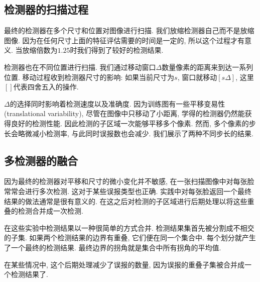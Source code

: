 \documentclass[a4paper,utf8,11pt, onecolumn]{ctexart}
\begin{document}
\subsection{检测器的扫描过程}
最终的检测器在多个尺寸和位置对图像进行扫描. 我们放缩检测器自己而不是放缩图像. 因为在任何尺寸上面的特征评估需要的时间是一定的, 所以这个过程才有意义. 当放缩倍数为$1.25$时我们得到了较好的检测结果.

检测器也在不同位置进行扫描. 我们通过移动窗口$\Delta$数量像素的距离来到达一系列位置. 移动过程收到检测器尺寸的影响: 如果当前尺寸为$s$, 窗口就移动$[s\Delta]$, 这里$[]$代表四舍五入的操作.

$\Delta$的选择同时影响着检测速度以及准确度. 因为训练图有一些平移变易性 (translational variability), 尽管在图像中只移动了小距离, 学得的检测器仍然能获得良好的检测性能. 因此检测的子区域一次能够平移多个像素.
然而, 多个像素的步长会略微减小检测率, 与此同时误报数也会减少. 我们展示了两种不同步长的结果.

\subsection{多检测器的融合}
因为最终的检测器对平移和尺寸的微小变化并不敏感, 在一张扫描图像中对每张脸常常会进行多次检测. 这对于某些误报类型也正确. 实践中对每张脸返回一个最终结果的做法通常是很有意义的. 在这之后对检测的子区域进行后期处理以将这些重叠的检测合并成一次检测.

在这些实验中检测结果以一种很简单的方式合并. 检测结果集首先被分割成不相交的子集. 如果两个检测结果的边界有重叠, 它们便在同一个集合中. 每个划分就产生了一个最终的检测结果. 最终边界的拐角就是集合中所有拐角的平均值.

在某些情况中, 这个后期处理减少了误报的数量, 因为误报的重叠子集被合并成一个检测结果了.
\end{document}
